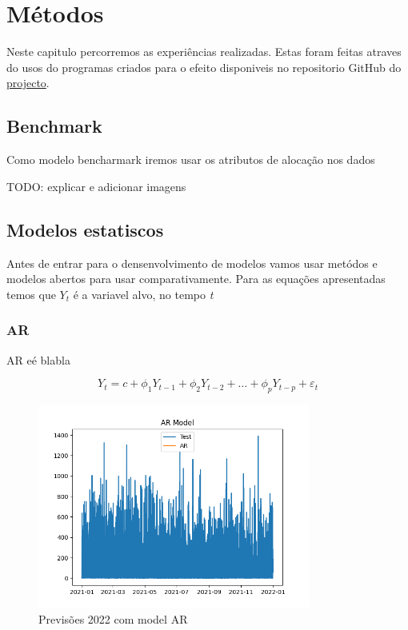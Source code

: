 \chapter{Métodos}

Neste capitulo percorremos as experiências realizadas. Estas foram feitas atraves do usos do programas criados para o efeito disponiveis no repositorio GitHub do \href{https://github.com/JotaFan/renewable-generation-into-reserve-markets}{projecto}.

\section{Benchmark}

Como modelo bencharmark iremos usar os atributos de alocação nos dados

TODO: explicar e adicionar imagens


\section{Modelos estatiscos  \label{se:dados_estudo}}

Antes de entrar para o densenvolvimento de modelos vamos usar metódos e modelos abertos para usar comparativamente.
Para as equações apresentadas temos que \textit{$Y_t$} é a variavel alvo, no tempo \textit{t}

\subsection{AR}

AR eé blabla

\begin{equation} \label{eq:AR} Y_t = c + \phi_1 Y_{t-1} + \phi_2 Y_{t-2} + \dots + \phi_p Y_{t-p} + \varepsilon_t \end{equation}

\begin{figure}[H]
    \centering
    \includegraphics[width=0.8\textwidth]{../plots/AR_model.png}
    \caption{Previsões 2022 com model AR}
    \label{fig:AR_model}
\end{figure}
  




